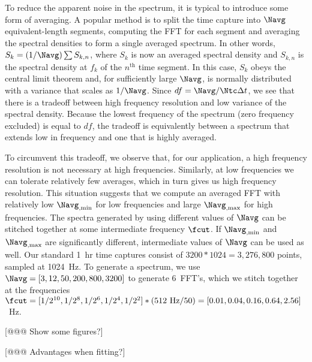 To reduce the apparent noise in the spectrum, it is typical to introduce some form of averaging. A popular method is to split the time capture into $\Navg$ equivalent-length segments, computing the FFT for each segment and averaging the spectral densities to form a single averaged spectrum. In other words, $S_k = (1/\Navg) \sum S_{k,n}$, where $S_k$ is now an averaged spectral density and $S_{k,n}$ is the spectral density at $f_k$ of the $n^\text{th}$ time segment. In this case, $S_k$ obeys the central limit theorem and, for sufficiently large $\Navg$, is normally distributed with a variance that scales as $1/\Navg$. Since $df = \Navg/\Ntc\Delta t$, we see that there is a tradeoff between high frequency resolution and low variance of the spectral density. Because the lowest frequency of the spectrum (zero frequency excluded) is equal to $df$, the tradeoff is equivalently between a spectrum that extends low in frequency and one that is highly averaged.

To circumvent this tradeoff, we observe that, for our application, a high frequency resolution is not necessary at high frequencies. Similarly, at low frequencies we can tolerate relatively few averages, which in turn gives us high frequency resolution. This situation suggests that we compute an averaged FFT with relatively low $\Navg_\text{,min}$ for low frequencies and large $\Navg_\text{,max}$ for high frequencies. The spectra generated by using different values of $\Navg$ can be stitched together at some intermediate frequency $\fcut$. If $\Navg_\text{,min}$ and $\Navg_\text{,max}$ are significantly different, intermediate values of $\Navg$ can be used as well. Our standard 1~hr time captures consist of $3200*1024 = 3,276,800$ points, sampled at 1024~Hz. To generate a spectrum, we use $\Navg = [3, 12, 50, 200, 800, 3200]$ to generate 6~FFT's, which we stitch together at the frequencies $\fcut = [1/2^{10}, 1/2^8, 1/2^6, 1/2^4, 1/2^2]*(512~\text{Hz}/50) = [0.01, 0.04, 0.16, 0.64, 2.56]$~Hz.

[@@@ Show some figures?]

[@@@ Advantages when fitting?]